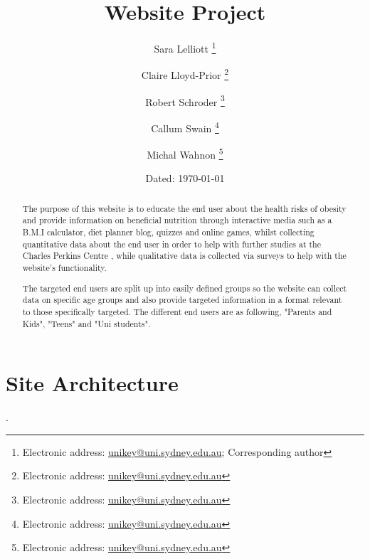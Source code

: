 \documentclass[letterpaper,12pt]{article}
\begin{document}

\author{Sara Lelliott%
  \thanks{Electronic address: \href{mailto:slel0001@uni.sydney.edu.au}{unikey@uni.sydney.edu.au}; Corresponding author}}
\author{Claire Lloyd-Prior%
  \thanks{Electronic address: \href{mailto:unikey@uni.sydney.edu.au}{unikey@uni.sydney.edu.au}}}
\author{Robert Schroder%
  \thanks{Electronic address: \href{mailto:unikey@uni.sydney.edu.au}{unikey@uni.sydney.edu.au}}}
\author{Callum Swain%
  \thanks{Electronic address: \href{mailto:unikey@uni.sydney.edu.au}{unikey@uni.sydney.edu.au}}}
\author{Michal Wahnon%
  \thanks{Electronic address: \href{mailto:unikey@uni.sydney.edu.au}{unikey@uni.sydney.edu.au}}}
\title{Website Project}
\date{Dated: \today}

\maketitle
\begin{abstract}
  The purpose of this website is to educate the end user about the health risks of obesity and provide information on beneficial nutrition through interactive media such as a B.M.I calculator, diet planner blog, quizzes and online games, whilst collecting quantitative data about the end user in order to help with further studies at the Charles Perkins Centre , while qualitative data is collected via surveys to help with the website's functionality.

The targeted end users are split up into easily defined groups so the website can collect data on specific age groups and also provide targeted information in a format relevant to those specifically targeted. The different end users are as following, "Parents and Kids", "Teens" and "Uni students".
\end{abstract}
\newpage
\listoffigures
\newpage
\tableofcontents
\newpage

\section{Site Architecture}

.

\end{document}

